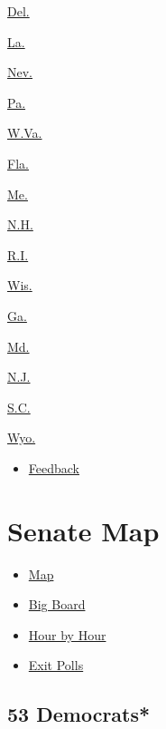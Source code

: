 \href{delaware.html}{Del.}

\href{louisiana.html}{La.}

\href{nevada.html}{Nev.}

\href{pennsylvania.html}{Pa.}

\href{west-virginia.html}{W.Va.}

\href{florida.html}{Fla.}

\href{maine.html}{Me.}

\href{new-hampshire.html}{N.H.}

\href{rhode-island.html}{R.I.}

\href{wisconsin.html}{Wis.}

\href{georgia.html}{Ga.}

\href{maryland.html}{Md.}

\href{new-jersey.html}{N.J.}

\href{south-carolina.html}{S.C.}

\href{wyoming.html}{Wyo.}

\begin{itemize}
\tightlist
\item
  \href{mailto:politics-feedback@NYTimes.com?subject=Senate\%20Results\%20Map\%20\%7C\%20User\%20Feedback\&body=Multimedia\%20from\%20NYTimes.com\%20\%0A\%20\%0ASenate\%20Results\%20Map\%0A/election_2010/results/senate\%0A\%0AMy\%20Comment:\%20\%0A}{Feedback}
\end{itemize}

\hypertarget{senate-map}{%
\section{Senate Map}\label{senate-map}}

\begin{itemize}
\tightlist
\item
  \href{senate.html}{Map}
\item
  \href{/elections/2010/results/senate/big-board.html}{Big Board}
\item
  \href{/elections/2010/results/senate/preview.html}{Hour by Hour}
\item
  \href{/elections/2010/results/senate/exit-polls.html}{Exit Polls}
\end{itemize}

\hypertarget{53-democrats}{%
\subsection{53 Democrats*}\label{53-democrats}}

